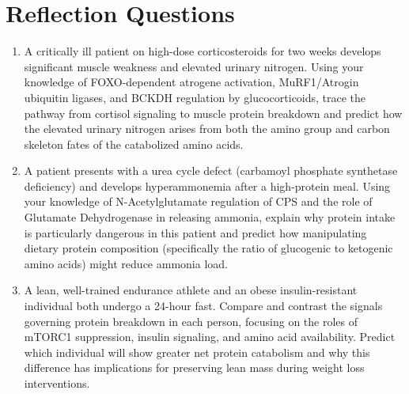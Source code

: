 \documentclass{tufte-handout}
\begin{document}

\section{Reflection Questions}
\begin{enumerate}
\item A critically ill patient on high-dose corticosteroids for two weeks develops significant muscle weakness and elevated urinary nitrogen. Using your knowledge of FOXO-dependent atrogene activation, MuRF1/Atrogin ubiquitin ligases, and BCKDH regulation by glucocorticoids, trace the pathway from cortisol signaling to muscle protein breakdown and predict how the elevated urinary nitrogen arises from both the amino group and carbon skeleton fates of the catabolized amino acids.
\item A patient presents with a urea cycle defect (carbamoyl phosphate synthetase deficiency) and develops hyperammonemia after a high-protein meal. Using your knowledge of N-Acetylglutamate regulation of CPS and the role of Glutamate Dehydrogenase in releasing ammonia, explain why protein intake is particularly dangerous in this patient and predict how manipulating dietary protein composition (specifically the ratio of glucogenic to ketogenic amino acids) might reduce ammonia load.
\item A lean, well-trained endurance athlete and an obese insulin-resistant individual both undergo a 24-hour fast. Compare and contrast the signals governing protein breakdown in each person, focusing on the roles of mTORC1 suppression, insulin signaling, and amino acid availability. Predict which individual will show greater net protein catabolism and why this difference has implications for preserving lean mass during weight loss interventions.
\end{enumerate}



\end{document}
